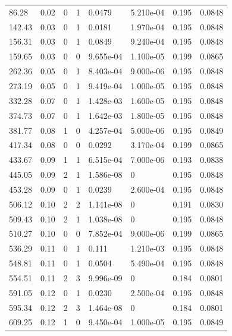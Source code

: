 \documentclass[preview]{standalone}
\begin{document}
{{\begin{tabular}{L{1.2cm}C{1.2cm} C{0.3cm}C{0.5cm} C{1.4cm}C{1.4cm} C{1.4cm}C{1.4cm}}
  86.28  &  0.02  & 0     &  1 &  0.0479  & 5.210e-04  & 0.195 &  0.0848   \\ 
  142.43  &  0.03  & 0     &  1 &  0.0181  & 1.970e-04  & 0.195 &  0.0848   \\ 
  156.31  &  0.03  & 0     &  1 &  0.0849  & 9.240e-04  & 0.195 &  0.0848   \\ 
  159.65  &  0.03  & 0     &  0 &  9.655e-04  & 1.100e-05  & 0.199 &  0.0865   \\ 
  262.36  &  0.05  & 0     &  1 &  8.403e-04  & 9.000e-06  & 0.195 &  0.0848   \\ 
  273.19  &  0.05  & 0     &  1 &  9.419e-04  & 1.000e-05  & 0.195 &  0.0848   \\ 
  332.28  &  0.07  & 0     &  1 &  1.428e-03  & 1.600e-05  & 0.195 &  0.0848   \\ 
  374.73  &  0.07  & 0     &  1 &  1.642e-03  & 1.800e-05  & 0.195 &  0.0848   \\ 
  381.77  &  0.08  & 1     &  0 &  4.257e-04  & 5.000e-06  & 0.195 &  0.0849   \\ 
  417.34  &  0.08  & 0     &  0 &  0.0292  & 3.170e-04  & 0.199 &  0.0865   \\ 
  433.67  &  0.09  & 1     &  1 &  6.515e-04  & 7.000e-06  & 0.193 &  0.0838   \\ 
  445.05  &  0.09  & 2     &  1 &  1.586e-08  & 0  & 0.195 &  0.0848   \\ 
  453.28  &  0.09  & 0     &  1 &  0.0239  & 2.600e-04  & 0.195 &  0.0848   \\ 
  506.12  &  0.10  & 2     &  2 &  1.141e-08  & 0  & 0.191 &  0.0830   \\ 
  509.43  &  0.10  & 2     &  1 &  1.038e-08  & 0  & 0.195 &  0.0848   \\ 
  510.27  &  0.10  & 0     &  0 &  7.852e-04  & 9.000e-06  & 0.199 &  0.0865   \\ 
  536.29  &  0.11  & 0     &  1 &  0.111  & 1.210e-03  & 0.195 &  0.0848   \\ 
  548.81  &  0.11  & 0     &  1 &  0.0504  & 5.490e-04  & 0.195 &  0.0848   \\ 
  554.51  &  0.11  & 2     &  3 &  9.996e-09  & 0  & 0.184 &  0.0801   \\ 
  591.05  &  0.12  & 0     &  1 &  0.0230  & 2.500e-04  & 0.195 &  0.0848   \\ 
  595.34  &  0.12  & 2     &  3 &  1.464e-08  & 0  & 0.184 &  0.0801   \\ 
  609.25  &  0.12  & 1     &  0 &  9.450e-04  & 1.000e-05  & 0.195 &  0.0849   \\ 

\end{tabular}}}
\end{document}
